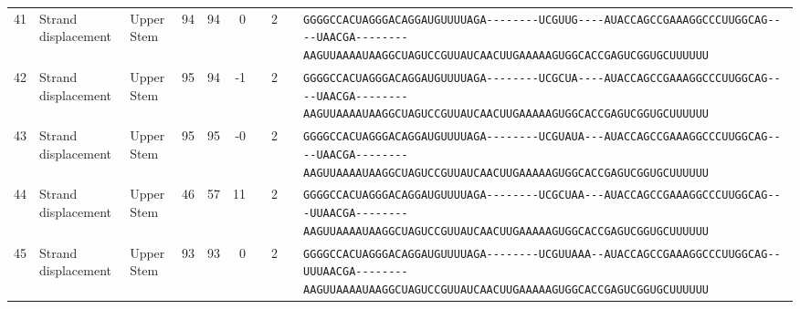 \begin{tabular}{rllrrrrrcl}
 41 & Strand displacement & Upper Stem & 94 & 94 & 0 &  & 2 &  &
 \color{ucsfdarkgrey}\verb|GGGGCCACUAGGGACAGGAU|\color{ucsforange}\verb|GUUUUA|\color{ucsfblue}\verb|GA--------UCGUUG----|\color{ucsfpurple}\verb|AUACCAGCCGAAAGGCCCUUGGCAG|\color{ucsfblue}\verb|----UAACGA--------AAGU|\color{ucsforange}\verb|UAAAAUAA|\color{ucsfnavy}\verb|GGCUAGUCC|\color{ucsforange}\verb|GUUAUCA|\color{ucsfteal}\verb|ACUUGAAAAAGU|\color{ucsforange}\verb|GGCACCGAGUCGGUGCUUUUUU| \\

 42 & Strand displacement & Upper Stem & 95 & 94 & -1 &  & 2 &  &
 \color{ucsfdarkgrey}\verb|GGGGCCACUAGGGACAGGAU|\color{ucsforange}\verb|GUUUUA|\color{ucsfblue}\verb|GA--------UCGCUA----|\color{ucsfpurple}\verb|AUACCAGCCGAAAGGCCCUUGGCAG|\color{ucsfblue}\verb|----UAACGA--------AAGU|\color{ucsforange}\verb|UAAAAUAA|\color{ucsfnavy}\verb|GGCUAGUCC|\color{ucsforange}\verb|GUUAUCA|\color{ucsfteal}\verb|ACUUGAAAAAGU|\color{ucsforange}\verb|GGCACCGAGUCGGUGCUUUUUU| \\

 43 & Strand displacement & Upper Stem & 95 & 95 & -0 &  & 2 &  &
 \color{ucsfdarkgrey}\verb|GGGGCCACUAGGGACAGGAU|\color{ucsforange}\verb|GUUUUA|\color{ucsfblue}\verb|GA--------UCGUAUA---|\color{ucsfpurple}\verb|AUACCAGCCGAAAGGCCCUUGGCAG|\color{ucsfblue}\verb|----UAACGA--------AAGU|\color{ucsforange}\verb|UAAAAUAA|\color{ucsfnavy}\verb|GGCUAGUCC|\color{ucsforange}\verb|GUUAUCA|\color{ucsfteal}\verb|ACUUGAAAAAGU|\color{ucsforange}\verb|GGCACCGAGUCGGUGCUUUUUU| \\

 44 & Strand displacement & Upper Stem & 46 & 57 & 11 &  & 2 &  &
 \color{ucsfdarkgrey}\verb|GGGGCCACUAGGGACAGGAU|\color{ucsforange}\verb|GUUUUA|\color{ucsfblue}\verb|GA--------UCGCUAA---|\color{ucsfpurple}\verb|AUACCAGCCGAAAGGCCCUUGGCAG|\color{ucsfblue}\verb|---UUAACGA--------AAGU|\color{ucsforange}\verb|UAAAAUAA|\color{ucsfnavy}\verb|GGCUAGUCC|\color{ucsforange}\verb|GUUAUCA|\color{ucsfteal}\verb|ACUUGAAAAAGU|\color{ucsforange}\verb|GGCACCGAGUCGGUGCUUUUUU| \\

 45 & Strand displacement & Upper Stem & 93 & 93 & 0 &  & 2 &  &
 \color{ucsfdarkgrey}\verb|GGGGCCACUAGGGACAGGAU|\color{ucsforange}\verb|GUUUUA|\color{ucsfblue}\verb|GA--------UCGUUAAA--|\color{ucsfpurple}\verb|AUACCAGCCGAAAGGCCCUUGGCAG|\color{ucsfblue}\verb|--UUUAACGA--------AAGU|\color{ucsforange}\verb|UAAAAUAA|\color{ucsfnavy}\verb|GGCUAGUCC|\color{ucsforange}\verb|GUUAUCA|\color{ucsfteal}\verb|ACUUGAAAAAGU|\color{ucsforange}\verb|GGCACCGAGUCGGUGCUUUUUU| \\


\end{tabular}
